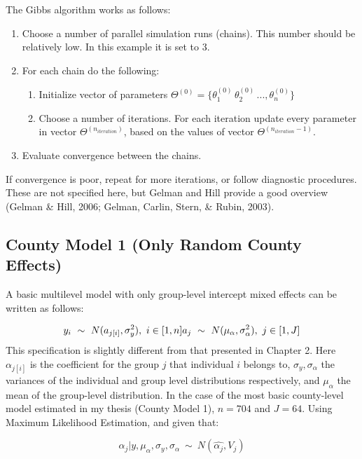 \documentclass[12pt,twoside]{reedthesis}
\begin{document}
  The Gibbs algorithm works as follows:
  
  \begin{enumerate}
    \item Choose a number of parallel simulation runs (chains). This number should be relatively low. In this example it is set to 3.
    \item For each chain do the following:
    \begin{enumerate}
      \item Initialize vector of parameters $\Theta^{(0)} = \{\theta^{(0)}_1\, \theta^{(0)}_2\, ..., \theta^{(0)}_n\}$
      \item Choose a number of iterations. For each iteration update every parameter in vector $\Theta^{(n_{iteration})}$, based on the values of vector $\Theta^{(n_{iteration} - 1)}$.
    \end{enumerate}
    \item Evaluate convergence between the chains.
  \end{enumerate}
  
  If convergence is poor, repeat for more iterations, or follow diagnostic
  procedures. These are not specified here, but Gelman and Hill provide a
  good overview (Gelman \& Hill, 2006; Gelman, Carlin, Stern, \& Rubin,
  2003).
  
  \subsection{County Model 1 (Only Random County
  Effects)}\label{county-model-1-only-random-county-effects}
  
  A basic multilevel model with only group-level intercept mixed effects
  can be written as follows:
  
  \[y_i \ \sim \ N(a_{j[i]}, \sigma^2_y),\ i \in [1, n] \\ a_j \ \sim \ N(\mu_{\alpha}, \sigma^2_{\alpha}), \ j \in [1,J]\]
  This specification is slightly different from that presented in Chapter
  2. Here \(\alpha_{j[i]}\) is the coefficient for the group \(j\) that
  individual \(i\) belongs to, \(\sigma_y, \sigma_{\alpha}\) the variances
  of the individual and group level distributions respectively, and
  \(\mu_{\alpha}\) the mean of the group-level distribution. In the case
  of the most basic county-level model estimated in my thesis (County
  Model 1), \(n = 704\) and \(J = 64\). Using Maximum Likelihood
  Estimation, and given that:
  
  \begin{equation}
    \alpha_j|y, \mu_{\alpha}, \sigma_y, \sigma_{\alpha} \ \sim \ N(\hat{\alpha_j}, V_j)
  \end{equation}
  
\end{document}

